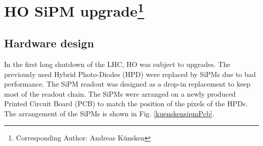 \section[HO SiPM upgrade]{HO SiPM upgrade\footnote{Corresponding Author: Andreas K\"unsken}}\label{sec:hoSipmUpgrade}
\subsection{Hardware design}\label{kuenskenHardwareDesign}
In the first long shutdown of the LHC, HO was subject to upgrades. The previously used Hybrid Photo-Diodes (HPD) were replaced by SiPMs due to bad performance. The SiPM readout was designed as a drop-in replacement to keep most of the readout chain. The SiPMs were arranged on a newly produced Printed Circuit Board (PCB) to match the position of the pixels of the HPDs. The arrangement of the SiPMs is shown in Fig. \ref{kuenskensipmPcb}.

